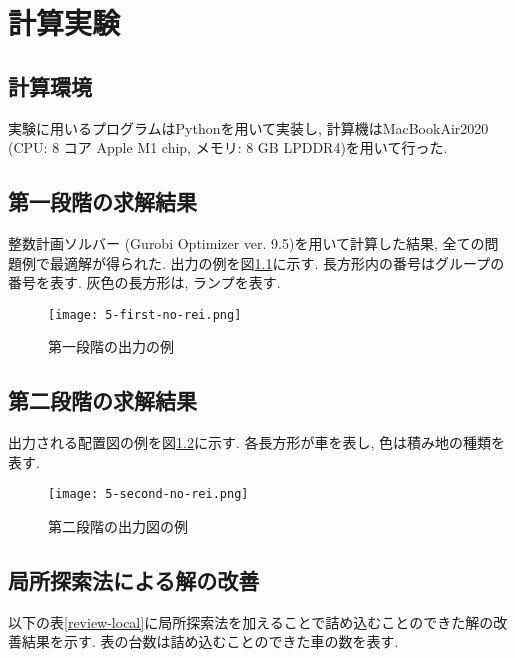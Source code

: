 \chapter{計算実験}\label{computational_result}
\section{計算環境}
実験に用いるプログラムはPythonを用いて実装し, 計算機はMacBookAir2020 (CPU: 8 コア Apple M1 chip, メモリ: 8 GB LPDDR4)を用いて行った. 

\section{第一段階の求解結果}
整数計画ソルバー (Gurobi Optimizer ver. 9.5)を用いて計算した結果, 全ての問題例で最適解が得られた. 
出力の例を図\ref{first-no-rei}に示す. 
長方形内の番号はグループの番号を表す. 
灰色の長方形は, ランプを表す. \\

\begin{figure}[b]
    \texttt{[image: 5-first-no-rei.png]}
    \caption{第一段階の出力の例}
    \label{first-no-rei}
\end{figure}
\clearpage

\section{第二段階の求解結果}
出力される配置図の例を図\ref{second-no-rei}に示す. 
各長方形が車を表し, 色は積み地の種類を表す. \\

\begin{figure}[b]
    \texttt{[image: 5-second-no-rei.png]}
    \caption{第二段階の出力図の例}
    \label{second-no-rei}
\end{figure}

\section{局所探索法による解の改善}
以下の表\ref{review-local}に局所探索法を加えることで詰め込むことのできた解の改善結果を示す. 
表の台数は詰め込むことのできた車の数を表す. 

